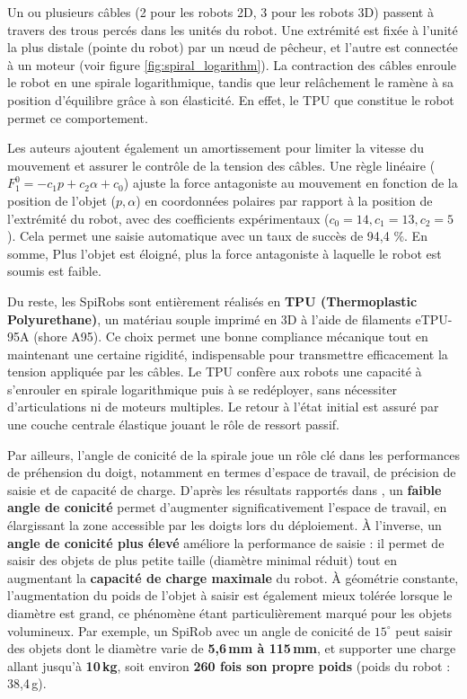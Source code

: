 \documentclass[a4paper, 11pt]{report}
\begin{document}
            Un ou plusieurs câbles (2 pour les robots 2D, 3 pour les robots 3D) passent à travers des trous percés dans les unités du robot. Une extrémité est fixée à l'unité la plus distale (pointe du robot) par un nœud de pêcheur, et l'autre est connectée à un moteur (voir figure \ref{fig:spiral_logarithm}). La contraction des câbles enroule le robot en une spirale logarithmique, tandis que leur relâchement le ramène à sa position d'équilibre grâce à son élasticité. En effet, le TPU que constitue le robot permet ce comportement. 

            Les auteurs ajoutent également un amortissement pour limiter la vitesse du mouvement et assurer le contrôle de la tension des câbles. Une règle linéaire ($F_1^0 = -c_1 p + c_2 \alpha + c_0$) ajuste la force antagoniste au mouvement en fonction de la position de l'objet ($p, \alpha$) en coordonnées polaires par rapport à la position de l'extrémité du robot, avec des coefficients expérimentaux ($c_0=14, c_1=13, c_2=5$). Cela permet une saisie automatique avec un taux de succès de 94,4 $\%$. En somme, Plus l'objet est éloigné, plus la force antagoniste à laquelle le robot est soumis est faible. \cite{wang_spirobs_2025}

            Du reste, les SpiRobs sont entièrement réalisés en \textbf{TPU (Thermoplastic Polyurethane)}, un matériau souple imprimé en 3D à l’aide de filaments eTPU-95A (shore A95). Ce choix permet une bonne compliance mécanique tout en maintenant une certaine rigidité, indispensable pour transmettre efficacement la tension appliquée par les câbles. Le TPU confère aux robots une capacité à s’enrouler en spirale logarithmique puis à se redéployer, sans nécessiter d’articulations ni de moteurs multiples. Le retour à l’état initial est assuré par une couche centrale élastique jouant le rôle de ressort passif. \cite{wang_spirobs_2025}

            Par ailleurs, l'angle de conicité de la spirale joue un rôle clé dans les performances de préhension du doigt, notamment en termes d’espace de travail, de précision de saisie et de capacité de charge. 
            D’après les résultats rapportés dans \cite{wang_spirobs_2025}, un \textbf{faible angle de conicité} permet d’augmenter significativement l’espace de travail, en élargissant la zone accessible par les doigts lors du déploiement. À l’inverse, un \textbf{angle de conicité plus élevé} améliore la performance de saisie : il permet de saisir des objets de plus petite taille (diamètre minimal réduit) tout en augmentant la \textbf{capacité de charge maximale} du robot.
            À géométrie constante, l’augmentation du poids de l’objet à saisir est également mieux tolérée lorsque le diamètre est grand, ce phénomène étant particulièrement marqué pour les objets volumineux. Par exemple, un SpiRob avec un angle de conicité de $15^\circ$ peut saisir des objets dont le diamètre varie de \textbf{5{,}6\,mm à 115\,mm}, et supporter une charge allant jusqu’à \textbf{10\,kg}, soit environ \textbf{260 fois son propre poids} (poids du robot : 38{,}4\,g). \cite{wang_spirobs_2025}
\end{document}
